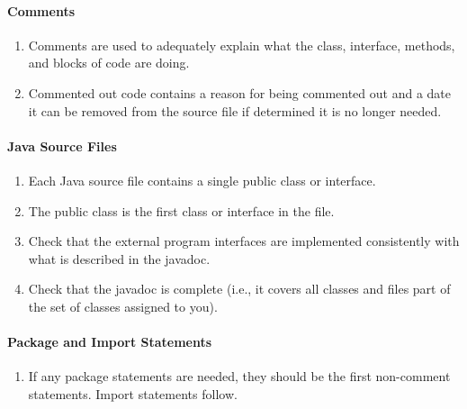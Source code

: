 \paragraph*{Comments}\begin{enumerate}[resume]
\item Comments are used to adequately explain what the class, interface, methods, and blocks of code are doing.
\item Commented out code contains a reason for being commented out and a date it can be removed from the source file if determined it is no longer needed.
\end{enumerate}

\paragraph*{Java Source Files}\begin{enumerate}[resume]
\item Each Java source file contains a single public class or interface.
\item The public class is the first class or interface in the file.
\item Check that the external program interfaces are implemented consistently with what is described in the javadoc.
\item Check that the javadoc is complete (i.e., it covers all classes and files part of the set of classes assigned to you).
\end{enumerate}

\paragraph*{Package and Import Statements}\begin{enumerate}[resume]
\item If any package statements are needed, they should be the first non-comment statements. Import statements follow.
\end{enumerate}

